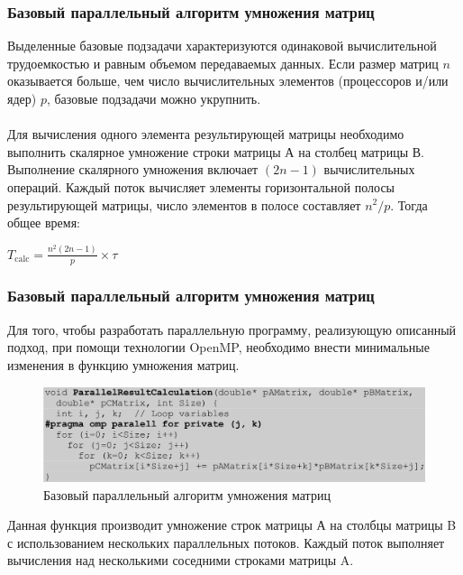 \documentclass{beamer}
\begin{document}

\begin{frame}
\frametitle{Базовый параллельный алгоритм умножения матриц}

Выделенные базовые подзадачи характеризуются одинаковой вычислительной трудоемкостью и равным объемом передаваемых данных. Если размер матриц $n$ оказывается больше, чем число вычислительных элементов (процессоров и/или ядер) $p$, базовые подзадачи можно укрупнить.\\~\\

Для вычисления одного элемента результирующей матрицы необходимо выполнить скалярное
умножение строки матрицы А на столбец матрицы В. Выполнение скалярного умножения включает $(2n-1)$
вычислительных операций. Каждый поток вычисляет элементы горизонтальной полосы результирующей
матрицы, число элементов в полосе составляет $n^2 /p$. Тогда общее время:

\begin{center}
$T_{\text{calc}} = \frac{n^2(2n-1)}{p} \times \tau$
\end{center}

\end{frame}


\begin{frame}
\frametitle{Базовый параллельный алгоритм умножения матриц}

Для того, чтобы разработать параллельную программу, реализующую описанный подход, при помощи технологии OpenMP, необходимо внести минимальные изменения в функцию умножения матриц.

\begin{figure}
\includegraphics[scale=0.28]{res/pic006}
\caption{Базовый параллельный алгоритм умножения матриц}
\end{figure}

Данная функция производит умножение строк матрицы А на столбцы матрицы B с использованием нескольких параллельных потоков. Каждый поток выполняет вычисления над несколькими соседними строками матрицы A.

\end{frame}
\end{document}
